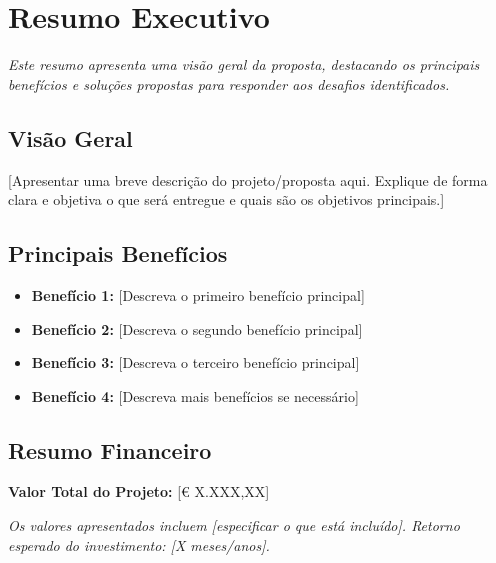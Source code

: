 \section{Resumo Executivo}

\begin{tcolorbox}[
    colback=white,
    colframe=prop-primary,
    boxrule=1pt,
    arc=3pt,
    left=15pt, right=15pt, top=15pt, bottom=15pt
]
    \textit{Este resumo apresenta uma visão geral da proposta, destacando os principais benefícios e soluções propostas para responder aos desafios identificados.}
\end{tcolorbox}

\vskip 1cm

\subsection{Visão Geral}

[Apresentar uma breve descrição do projeto/proposta aqui. Explique de forma clara e objetiva o que será entregue e quais são os objetivos principais.]

\vskip 0.8cm

\subsection{Principais Benefícios}

\begin{itemize}
    \item \textbf{Benefício 1:} [Descreva o primeiro benefício principal]
    \item \textbf{Benefício 2:} [Descreva o segundo benefício principal]
    \item \textbf{Benefício 3:} [Descreva o terceiro benefício principal]
    \item \textbf{Benefício 4:} [Descreva mais benefícios se necessário]
\end{itemize}

\vskip 1cm

\subsection{Resumo Financeiro}

\begin{tcolorbox}[
    colback=prop-light,
    colframe=prop-accent,
    boxrule=1pt,
    arc=5pt,
    left=15pt, right=15pt, top=10pt, bottom=10pt
]
    \textbf{Valor Total do Projeto:} [€ X.XXX,XX]
    
    \vskip 0.3cm
    
    \textit{Os valores apresentados incluem [especificar o que está incluído]. Retorno esperado do investimento: [X meses/anos].}
\end{tcolorbox}
